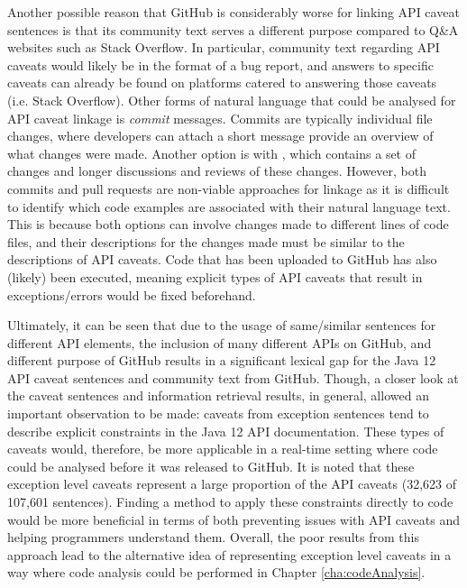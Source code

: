 Another possible reason that GitHub is considerably worse for linking API caveat sentences is that its community text serves a different purpose compared to Q\&A websites such as Stack Overflow. In particular, community text regarding API caveats would likely be in the format of a bug report, and answers to specific caveats can already be found on platforms catered to answering those caveats (i.e. Stack Overflow). Other forms of natural language that could be analysed for API caveat linkage is \textit{commit} messages. Commits are typically individual file changes, where developers can attach a short message provide an overview of what changes were made. Another option is with , which contains a set of changes and longer discussions and reviews of these changes. However, both commits and pull requests are non-viable approaches for linkage as it is difficult to identify which code examples are associated with their natural language text. This is because both options can involve changes made to different lines of code files, and their descriptions for the changes made must be similar to the descriptions of API caveats. Code that has been uploaded to GitHub has also (likely) been executed, meaning explicit types of API caveats that result in exceptions/errors would be fixed beforehand.

Ultimately, it can be seen that due to the usage of same/similar sentences for different API elements, the inclusion of many different APIs on GitHub, and different purpose of GitHub results in a significant lexical gap for the Java 12 API caveat sentences and community text from GitHub. Though, a closer look at the caveat sentences and information retrieval results, in general, allowed an important observation to be made: caveats from exception sentences tend to describe explicit constraints in the Java 12 API documentation. These types of caveats would, therefore, be more applicable in a real-time setting where code could be analysed before it was released to GitHub. It is noted that these exception level caveats represent a large proportion of the API caveats (32,623 of 107,601 sentences).   Finding a method to apply these constraints directly to code would be more beneficial in terms of both preventing issues with API caveats and helping programmers understand them. Overall, the poor results from this approach lead to the alternative idea of representing exception level caveats in a way where code analysis could be performed in Chapter \ref{cha:codeAnalysis}.

